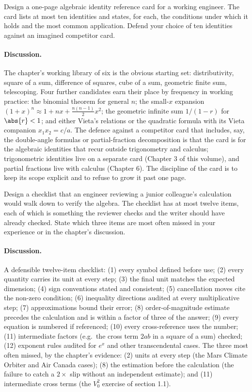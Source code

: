 \begin{exercise}
Design a one-page algebraic identity reference card for a working
engineer. The card lists at most ten identities and states, for
each, the conditions under which it holds and the most common
application. Defend your choice of ten identities against an
imagined competitor card.

\paragraph{Discussion.}
The chapter's working library of six is the obvious starting set:
distributivity, square of a sum, difference of squares, cube of a
sum, geometric finite sum, telescoping. Four further candidates earn
their place by frequency in working practice: the binomial theorem
for general $n$; the small-$x$ expansion $(1 + x)^{n} \approx 1 +
nx + \tfrac{n(n-1)}{2} x^{2}$; the geometric infinite sum
$1/(1 - r)$ for $\abs{r} < 1$; and either Vieta's relations or the
quadratic formula with its Vieta companion $x_{1} x_{2} = c/a$.
The defence against a competitor card that includes, say, the
double-angle formulas or partial-fraction decomposition is that the
card is for the algebraic identities that recur outside trigonometry
and calculus; trigonometric identities live on a separate card
(Chapter 3 of this volume), and partial fractions live with calculus
(Chapter 6). The discipline of the card is to keep its scope
explicit and to refuse to grow it past one page.
\end{exercise}

\begin{exercise}
Design a checklist that an engineer reviewing a junior colleague's
calculation would walk down to verify the algebra. The checklist
has at most twelve items, each of which is something the reviewer
checks and the writer should have already checked. State which
three items are most often missed in your experience or in the
chapter's discussion.

\paragraph{Discussion.}
A defensible twelve-item checklist: (1) every symbol defined before
use; (2) every quantity carries its unit at every step; (3) the
final unit matches the expected dimension; (4) sign conventions
stated and consistent; (5) cancellation moves cite the non-zero
condition; (6) inequality directions audited at every multiplicative
step; (7) approximations bound their error; (8) order-of-magnitude
estimate precedes the calculation and is within a factor of three of
the answer; (9) every equation is numbered if referenced; (10) every
cross-reference uses the number; (11) intermediate factors
(e.g.\ the cross term $2ab$ in a square of a sum) checked; (12)
exponent rules audited for $e^{x}$ and other transcendental cases.
The three most often missed, by the chapter's evidence: (2) units at
every step (the Mars Climate Orbiter and Air Canada cases); (8) the
estimation before the calculation (the failure to catch a
$2 \times$ slip without an independent estimate); and (11)
intermediate cross terms (the $V_{0}^{2}$ exercise of section 1.1).
\end{exercise}

